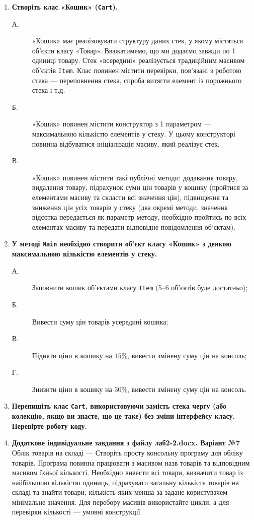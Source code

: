 \begin{enumerate}
    \item \textbf{Створіть клас «Кошик» (\texttt{Cart}).}
    \begin{description}
        \item[А.] «Кошик» має реалізовувати структуру даних стек, у якому містяться об'єкти 
        класу «Товар». Вважатимемо, що ми додаємо завжди по 1 одиниці товару. Стек «всередині» 
        реалізується традиційним масивом об'єктів \texttt{Item}. Клас повинен містити перевірки, 
        пов'язані з роботою стека — переповнення стека, спроба витягти елемент із порожнього стека 
        і т.д.
        \item[Б.] «Кошик» повинен містити конструктор з 1 параметром — максимальною кількістю 
        елементів у стеку. У цьому конструкторі повинна відбуватися ініціалізація масиву, який 
        реалізує стек.
        \item[В.] «Кошик» повинен містити такі публічні методи: додавання товару, видалення 
        товару, підрахунок суми цін товарів у кошику (пройтися за елементами масиву та скласти 
        всі значення цін), підвищення та зниження цін усіх товарів у стеку (два окремі методи, 
        значення відсотка передається як параметр методу, необхідно пройтись по всіх елементах 
        масиву та передати відповідне повідомлення об'єктам).
    \end{description}

    \item \textbf{У методі \texttt{Main} необхідно створити об'єкт класу «Кошик» з деякою максимальною 
    кількістю елементів у стеку.}
    \begin{description}
        \item[А.] Заповнити кошик об'єктами класу \texttt{Item} (5--6 об'єктів буде достатньо);
        \item[Б.] Вивести суму цін товарів усередині кошика;
        \item[В.] Підняти ціни в кошику на $15\%$, вивести змінену суму цін на консоль;
        \item[Г.] Знизити ціни в кошику на $30\%$, вивести змінену суму цін на консоль.
    \end{description}

    \item \textbf{Перепишіть клас \texttt{Cart}, використовуючи замість стека чергу 
    (або колекцію, якщо ви знаєте, що це таке) без зміни інтерфейсу класу. Перевірте роботу коду.}

    \item \textbf{Додаткове індивідуальне завдання з файлу лаб2-2.docx. Варіант №7}\\
    Облік товарів на складі — Створіть просту консольну програму для обліку товарів. 
    Програма повинна працювати з масивом назв товарів та відповідним масивом їхньої кількості. 
    Необхідно вивести всі товари, визначити товар із найбільшою кількістю одиниць, підрахувати 
    загальну кількість товарів на складі та знайти товари, кількість яких менша за задане 
    користувачем мінімальне значення. Для перебору масивів використайте цикли, а для перевірки 
    кількості — умовні конструкції. 
\end{enumerate}
